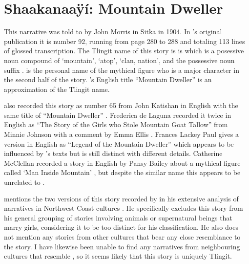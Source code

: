 
\resetexcnt
\chapter{Shaakanaaÿí: Mountain Dweller}\label{ch:92-mountain-dweller}

This narrative was told to \citeauthor{swanton:1909} by  John Morris in Sitka in 1904.
In \citeauthor{swanton:1909}’s original publication it is number 92, running from page 280 to 288 and totaling 113 lines of glossed transcription.
The Tlingit name of this story is is  which is a posessive noun compound of  ‘mountain’,  ‘atop’,  ‘clan, nation’, and the possessive noun suffix .
 is the personal name of the mythical figure who is a major character in the second half of the story.
\citeauthor{swanton:1909}’s English title “Mountain Dweller” is an approximation of the Tlingit name.

\citeauthor{swanton:1909} also recorded this story as number 65 from  John Katishan in English with the same title of “Mountain Dweller” \parencite[222–224]{swanton:1909}.
Frederica de Laguna recorded it twice in English as “The Story of the Girls who Stole Mountain Goat Tallow” from  Minnie Johnson with a comment by  Emma Ellis \parencite[892–893]{de-laguna:1972}.
Frances Lackey Paul  gives a version in English as “Legend of the Mountain Dweller” \parencite[70–71]{paul:1944} which appears to be influenced by \citeauthor{swanton:1909}’s texts but is still distinct with different details.
Catherine McClellan recorded a story in English by  Pansy Bailey about a mythical figure called  ‘Man Inside Mountain’ \parencite[692–695]{mcclellan-cruikshank:2007c}, but despite the similar name this appears to be unrelated to .

\citeauthor{boas:1916} mentions the two versions of this story recorded by \citeauthor{swanton:1909} in his extensive analysis of narratives in Northwest Coast cultures \parencite[758]{boas:1916}.
He specifically excludes this story from his general grouping of stories involving animals or supernatural beings that marry girls, considering it to be too distinct for his classification.
He also does not mention any stories from other cultures that bear any close resemblance to the  story.
I have likewise been unable to find any narratives from neighbouring cultures that resemble , so it seems likely that this story is uniquely Tlingit.


